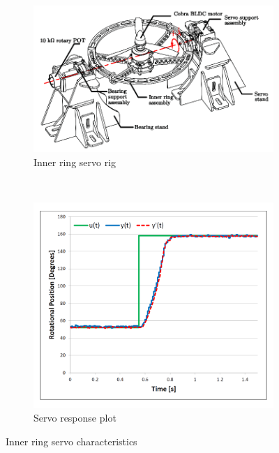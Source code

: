 \begin{figure}[htbp]
\vspace{-6pt}
\centering
\begin{subfigure}{0.7\textwidth}
\centering
\includegraphics[width=\textwidth]{figs/servo-inner}
\vspace{-10pt}
\caption{Inner ring servo rig}
\label{fig:servo-inner}
\end{subfigure}
\\
\begin{subfigure}{0.49\textwidth}
\centering
\includegraphics[width=\textwidth]{graphs/servo-step-inner}
\caption{Servo response plot}
\label{fig:servo-step-inner}
\end{subfigure}
\vspace{-4pt}
\caption{Inner ring servo characteristics}
\label{fig:servo-inner-character}
\vspace{-10pt}
\end{figure}
